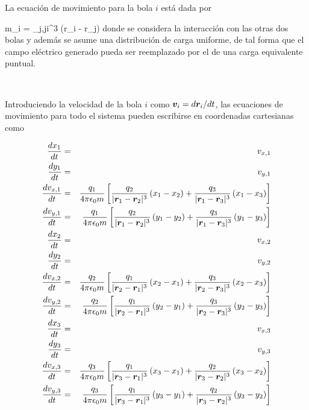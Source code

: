 La ecuación de movimiento para la bola $i$ está dada por 


{ m_i = \sum_{j,j\neq i}^3  
(\bds r_i - \bds r_j) }
donde se considera la interacción con las otras dos bolas y además se asume
una distribución de carga uniforme, de tal forma que el campo eléctrico 
generado pueda ser reemplazado por el de una carga equivalente puntual.

\

Introduciendo la velocidad de la bola $i$ como $\boldsymbol{ v }_i = d\boldsymbol{ r }_i/dt$,
las ecuaciones de movimiento para todo el sistema pueden escribirse en
coordenadas cartesianas como

\begin{eqnarray}
\label{eq:balls_eqs_i}
\frac{ d x_1 }{d t} &=& v_{x,1}										 \\
\frac{ d y_1 }{d t} &=& v_{y,1} 										 \\
\frac{ d v_{x,1} }{d t} &=& \frac{q_1}{4\pi \epsilon_0 m} 
\left[  \frac{q_2}{|\boldsymbol{ r }_1 - \boldsymbol{ r }_2|^3}\left( x_1 - x_2 \right) + 
\frac{q_3}{|\boldsymbol{ r }_1 - \boldsymbol{ r }_3|^3}\left( x_1 - x_3 \right)  \right]				 \\
\frac{ d v_{y,1} }{d t} &=& \frac{q_1}{4\pi \epsilon_0 m}
\left[  \frac{q_2}{|\boldsymbol{ r }_1 - \boldsymbol{ r }_2|^3}\left( y_1 - y_2 \right) + 
\frac{q_3}{|\boldsymbol{ r }_1 - \boldsymbol{ r }_3|^3}\left( y_1 - y_3 \right)  \right]				 \\
\frac{ d x_2 }{d t} &=& v_{x,2}										 \\
\frac{ d y_2 }{d t} &=& v_{y,2} 										 \\
\frac{ d v_{x,2} }{d t} &=& \frac{q_2}{4\pi \epsilon_0 m} 
\left[  \frac{q_1}{|\boldsymbol{ r }_2 - \boldsymbol{ r }_1|^3}\left( x_2 - x_1 \right) + 
\frac{q_3}{|\boldsymbol{ r }_2 - \boldsymbol{ r }_3|^3}\left( x_2 - x_3 \right)  \right]				 \\
\frac{ d v_{y,2} }{d t} &=& \frac{q_2}{4\pi \epsilon_0 m}
\left[  \frac{q_1}{|\boldsymbol{ r }_2 - \boldsymbol{ r }_1|^3}\left( y_2 - y_1 \right) + 
\frac{q_3}{|\boldsymbol{ r }_2 - \boldsymbol{ r }_3|^3}\left( y_2 - y_3 \right)  \right]				 \\
\frac{ d x_3 }{d t} &=& v_{x,3}										 \\
\frac{ d y_3 }{d t} &=& v_{y,3} 										 \\
\frac{ d v_{x,3} }{d t} &=& \frac{q_3}{4\pi \epsilon_0 m} 
\left[  \frac{q_1}{|\boldsymbol{ r }_3 - \boldsymbol{ r }_1|^3}\left( x_3 - x_1 \right) + 
\frac{q_2}{|\boldsymbol{ r }_3 - \boldsymbol{ r }_2|^3}\left( x_3 - x_2 \right)  \right]				 \\
\label{eq:balls_eqs_f}
\frac{ d v_{y,3} }{d t} &=& \frac{q_3}{4\pi \epsilon_0 m}
\left[  \frac{q_1}{|\boldsymbol{ r }_3 - \boldsymbol{ r }_1|^3}\left( y_3 - y_1 \right) + 
\frac{q_2}{|\boldsymbol{ r }_3 - \boldsymbol{ r }_2|^3}\left( y_3 - y_2 \right)  \right]
\end{eqnarray}


